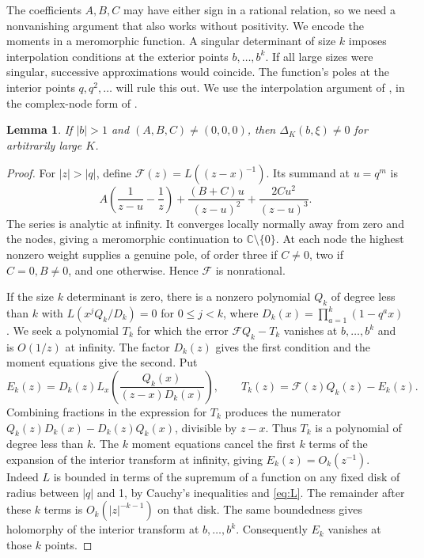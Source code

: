 \documentclass[11pt]{article}
\newtheorem{lemma}[theorem]{Lemma}
\newcommand{\C}{\mathbb C}
\begin{document}
The coefficients \(A,B,C\) may have either sign in a rational
relation, so we need a nonvanishing argument that also works without
positivity. We encode the moments in a meromorphic function. A
singular determinant of size \(k\) imposes interpolation conditions
at the exterior points \(b,\ldots,b^k\).
If all large sizes were singular, successive approximations would
coincide. The function's poles at the interior points \(q,q^2,\ldots\)
will rule this out. We use the interpolation argument of
\cite[\S5]{Uplift}, in the complex-node form of \cite[\S5]{Golden}.

\begin{lemma}\label{lem:nonzero}
If \(|b|>1\) and \((A,B,C)\ne(0,0,0)\), then
\(\Delta_K(b,\xi)\ne0\) for arbitrarily large \(K\).
\end{lemma}
\begin{proof}
For \(|z|>|q|\), define \(\mathcal F(z)=L((z-x)^{-1})\).
Its summand at \(u=q^m\) is
\[
 A\left(\frac1{z-u}-\frac1z\right)
 +\frac{(B+C)u}{(z-u)^2}+\frac{2Cu^2}{(z-u)^3}.
\]
The series is analytic at infinity. It converges locally normally
away from zero and the nodes, giving a meromorphic continuation to
\(\C\setminus\{0\}\). At each node the highest nonzero
weight supplies a genuine pole, of order three if \(C\ne0\), two
if \(C=0,B\ne0\), and one otherwise. Hence \(\mathcal F\) is nonrational.

If the size \(k\) determinant is zero, there is a nonzero polynomial
\(Q_k\) of degree less than \(k\) with \(L(x^jQ_k/D_k)=0\) for
\(0\le j<k\), where \(D_k(x)=\prod_{a=1}^k(1-q^a x)\).
We seek a polynomial \(T_k\) for which the error
\(\mathcal F Q_k-T_k\) vanishes at \(b,\ldots,b^k\) and is
\(O(1/z)\) at infinity. The factor \(D_k(z)\) gives the first
condition and the moment equations give the second. Put
\[
 E_k(z)= D_k(z)L_x\!\left(\frac{Q_k(x)}{(z-x)D_k(x)}\right),
 \qquad T_k(z)=\mathcal F(z)Q_k(z)-E_k(z).
\]
Combining fractions in the expression for \(T_k\) produces the
numerator \(Q_k(z)D_k(x)-D_k(z)Q_k(x)\), divisible by \(z-x\).
Thus \(T_k\) is a polynomial of degree less than \(k\).
The \(k\) moment equations cancel the first \(k\) terms of the expansion
of the interior transform at infinity, giving \(E_k(z)=O_k(z^{-1})\).
Indeed \(L\) is bounded in terms of the supremum of a function on
any fixed disk of radius between \(|q|\) and 1, by Cauchy's
inequalities and \eqref{eq:L}. The remainder after these \(k\)
terms is \(O_k(|z|^{-k-1})\) on that disk. The same boundedness
gives holomorphy of the interior transform at \(b,\ldots,b^k\).
Consequently \(E_k\) vanishes at those \(k\) points.


\end{proof}
\end{document}
